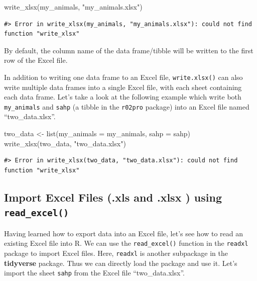 \documentclass[
]{book}
\newenvironment{Shaded}{\begin{snugshade}}{\end{snugshade}}
\newcommand{\AttributeTok}[1]{\textcolor[rgb]{0.77,0.63,0.00}{#1}}
\newcommand{\FunctionTok}[1]{\textcolor[rgb]{0.00,0.00,0.00}{#1}}
\newcommand{\NormalTok}[1]{#1}
\newcommand{\OtherTok}[1]{\textcolor[rgb]{0.56,0.35,0.01}{#1}}
\newcommand{\StringTok}[1]{\textcolor[rgb]{0.31,0.60,0.02}{#1}}
\begin{document}
\begin{Shaded}
\begin{Highlighting}[]
\FunctionTok{write\_xlsx}\NormalTok{(my\_animals, }\StringTok{"my\_animals.xlsx"}\NormalTok{)}
\end{Highlighting}
\end{Shaded}

\begin{verbatim}
#> Error in write_xlsx(my_animals, "my_animals.xlsx"): could not find function "write_xlsx"
\end{verbatim}

By default, the column name of the data frame/tibble will be written to the first row of the Excel file.

In addition to writing one data frame to an Excel file, \texttt{write.xlsx()} can also write multiple data frames into a single Excel file, with each sheet containing each data frame. Let's take a look at the following example which write both \texttt{my\_animals} and \texttt{sahp} (a tibble in the \texttt{r02pro} package) into an Excel file named ``two\_data.xlsx''.

\begin{Shaded}
\begin{Highlighting}[]
\NormalTok{two\_data }\OtherTok{\textless{}{-}} \FunctionTok{list}\NormalTok{(}\AttributeTok{my\_animals =}\NormalTok{ my\_animals, }\AttributeTok{sahp =}\NormalTok{ sahp)}
\FunctionTok{write\_xlsx}\NormalTok{(two\_data, }\StringTok{"two\_data.xlsx"}\NormalTok{)}
\end{Highlighting}
\end{Shaded}

\begin{verbatim}
#> Error in write_xlsx(two_data, "two_data.xlsx"): could not find function "write_xlsx"
\end{verbatim}

\hypertarget{import-excel-files-.xls-and-.xlsx-using-read_excel}{%
\subsection{\texorpdfstring{Import Excel Files (.xls and .xlsx ) using \texttt{read\_excel()}}{Import Excel Files (.xls and .xlsx ) using read\_excel()}}\label{import-excel-files-.xls-and-.xlsx-using-read_excel}}

Having learned how to export data into an Excel file, let's see how to read an existing Excel file into R. We can use the \texttt{read\_excel()} function in the \texttt{readxl} package to import Excel files. Here, \texttt{readxl} is another subpackage in the \textbf{tidyverse} package. Thus we can directly load the package and use it.
Let's import the sheet \texttt{sahp} from the Excel file ``two\_data.xlsx''.
\end{document}
